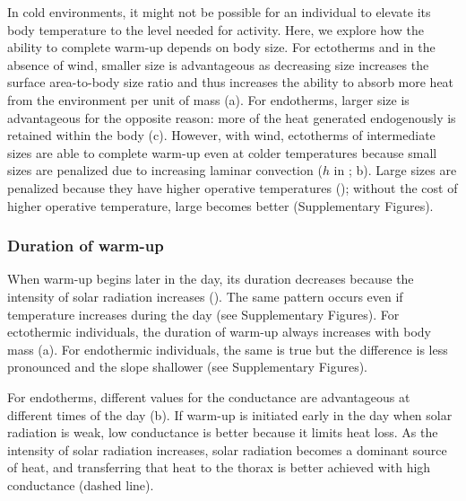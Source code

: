 In cold environments, it might not be possible for an individual to elevate its body temperature to the level needed for activity.
Here, we explore how the ability to complete warm-up depends on body size.
For ectotherms and in the absence of wind, smaller size is advantageous as decreasing size increases the surface area-to-body size ratio and thus increases the ability to absorb more heat from the environment per unit of mass (a).
For endotherms, larger size is advantageous for the opposite reason: more of the heat generated endogenously is retained within the body (c).
However, with wind, ectotherms of intermediate sizes are able to complete warm-up even at colder temperatures because small sizes are penalized due to increasing laminar convection ($h$ in ; b).
Large sizes are penalized because they have higher operative temperatures (); without the cost of higher operative temperature, large becomes better (Supplementary Figures).


\subsubsection*{Duration of warm-up}

When warm-up begins later in the day, its duration decreases because the intensity of solar radiation increases ().
The same pattern occurs even if temperature increases during the day (see Supplementary Figures).
For ectothermic individuals, the duration of warm-up always increases with body mass (a).
For endothermic individuals, the same is true but the difference is less pronounced and the slope shallower (see Supplementary Figures).

For endotherms, different values for the conductance are advantageous at different times of the day (b).
If warm-up is initiated early in the day when solar radiation is weak, low conductance is better because it limits heat loss.
As the intensity of solar radiation increases, solar radiation becomes a dominant source of heat, and transferring that heat to the thorax is better achieved with high conductance (dashed line).


